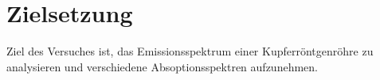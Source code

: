 \section{Zielsetzung}
\label{sec:zielsetzung}
Ziel des Versuches ist, das Emissionsspektrum einer Kupferröntgenröhre zu analysieren 
und verschiedene Absoptionsspektren aufzunehmen.